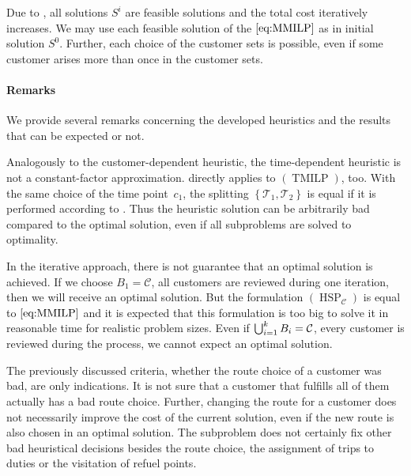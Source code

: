 Due to , all solutions $S^i$ are feasible solutions and the total cost iteratively increases. We may use each feasible solution of the $\eqref{eq:MMILP}$ as in initial solution $S^0$. Further, each choice of the customer sets is possible, even if some customer arises more than once in the customer sets.

\paragraph{Remarks} \parfill

We provide several remarks concerning the developed heuristics and the results that can be expected or not.

Analogously to the customer-dependent heuristic, the time-dependent heuristic is not a constant-factor approximation.  directly applies to $(\operatorname{TMILP})$, too. With the same choice of the time point~$c_1$, the splitting $\left\{\mathcal{T}_1,\mathcal{T}_2\right\}$ is equal if it is performed according to . Thus the heuristic solution can be arbitrarily bad compared to the optimal solution, even if all subproblems are solved to optimality.

In the iterative approach, there is not guarantee that an optimal solution is achieved. If we choose $B_1=\mathcal{C}$, \ie all customers are reviewed during one iteration, then we will receive an optimal solution. But the formulation $(\operatorname{HSP}_{\mathcal{C}})$ is equal to $\eqref{eq:MMILP}$ and it is expected that this formulation is too big to solve it in reasonable time for realistic problem sizes. Even if ${\bigcup_{i=1}^k B_i = \mathcal{C}}$, \ie every customer is reviewed during the process, we cannot expect an optimal solution.

The previously discussed criteria, whether the route choice of a customer was bad, are only indications. It is not sure that a customer that fulfills all of them actually has a bad route choice. Further, changing the route for a customer does not necessarily improve the cost of the current solution, even if the new route is also chosen in an optimal solution. The subproblem does not certainly fix other bad heuristical decisions besides the route choice, \eg the assignment of trips to duties or the visitation of refuel points.

